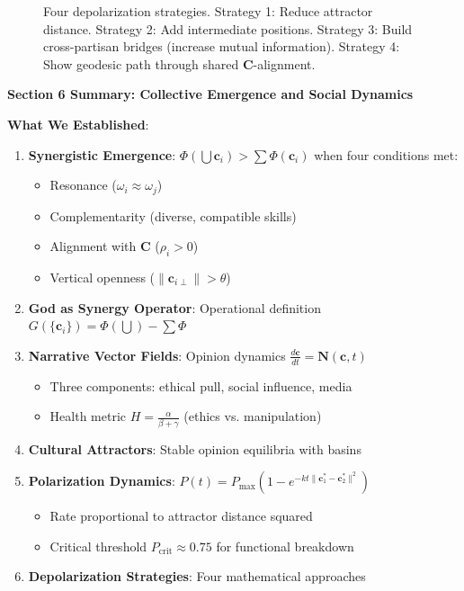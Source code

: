 \documentclass[11pt,a4paper]{article}
\theoremstyle{definition}
\theoremstyle{remark}
\newcommand{\cc}{\mathbf{c}}
\begin{document}
\begin{enumerate}
\begin{figure}[H]
\caption{Four depolarization strategies. Strategy 1: Reduce attractor distance. Strategy 2: Add intermediate positions. Strategy 3: Build cross-partisan bridges (increase mutual information). Strategy 4: Show geodesic path through shared \(\mathbf{C}\)-alignment.}
\label{fig:depolarization_strategies}
\end{figure}

\begin{mdframed}[backgroundcolor=green!10,linewidth=2pt,linecolor=green!70!black]
\textbf{Section 6 Summary: Collective Emergence and Social Dynamics}

\textbf{What We Established}:
\begin{enumerate}[nosep]
    \item \textbf{Synergistic Emergence}: \(\Phi(\bigcup \cc_i) > \sum \Phi(\cc_i)\) when four conditions met:
        \begin{itemize}[nosep]
            \item Resonance (\(\omega_i \approx \omega_j\))
            \item Complementarity (diverse, compatible skills)
            \item Alignment with \(\mathbf{C}\) (\(\rho_i > 0\))
            \item Vertical openness (\(\|\cc_{i\perp}\| > \theta\))
        \end{itemize}
    \item \textbf{God as Synergy Operator}: Operational definition \(G(\{\cc_i\}) = \Phi(\bigcup) - \sum \Phi\)
    \item \textbf{Narrative Vector Fields}: Opinion dynamics \(\frac{d\cc}{dt} = \mathbf{N}(\cc,t)\)
        \begin{itemize}[nosep]
            \item Three components: ethical pull, social influence, media
            \item Health metric \(H = \frac{\alpha}{\beta + \gamma}\) (ethics vs. manipulation)
        \end{itemize}
    \item \textbf{Cultural Attractors}: Stable opinion equilibria with basins
    \item \textbf{Polarization Dynamics}: \(P(t) = P_{\max}(1 - e^{-kt\|\cc^*_1 - \cc^*_2\|^2})\)
        \begin{itemize}[nosep]
            \item Rate proportional to attractor distance squared
            \item Critical threshold \(P_{\text{crit}} \approx 0.75\) for functional breakdown
        \end{itemize}
    \item \textbf{Depolarization Strategies}: Four mathematical approaches
\end{enumerate}


\end{mdframed}
\end{enumerate}
\end{document}
